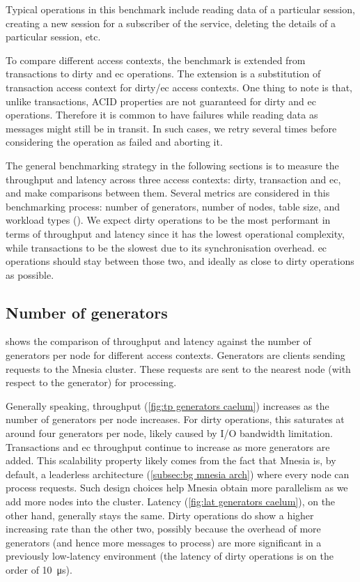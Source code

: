 Typical operations in this benchmark include reading
data of a particular session, creating a new session for a subscriber of
the service, deleting the details of a particular session, etc.

To compare different access contexts, the benchmark is extended from transactions 
to dirty and \acrshort{ec} operations. The extension is a substitution of transaction
access context for dirty/\acrshort{ec} access contexts. One thing to note is that,
unlike transactions, ACID properties are not guaranteed for dirty and \acrshort{ec}
operations. Therefore it is common
to have failures while reading data as messages might still be in transit. 
In such cases, we retry several times before considering the operation
as failed and aborting it.

The general benchmarking strategy in the following sections is to measure 
the throughput and latency across three access contexts: dirty, transaction 
and \acrshort{ec}, and make comparisons between them. Several metrics are 
considered in this benchmarking process: number of generators, 
number of nodes, table size, and workload types 
().
We expect dirty operations to be the most performant in terms of throughput and 
latency since it has the lowest 
operational complexity, while transactions to be the slowest
due to its synchronisation overhead. \acrshort{ec} operations should stay
between those two, and ideally as close to dirty operations as possible.


\subsection{Number of generators} \label{subsec:eval generator number}

 shows the comparison of throughput and latency against
the number of generators per node for different access contexts. Generators are clients 
sending requests to the Mnesia cluster. 
These requests are sent to the nearest node (with respect to the generator) for processing. 

Generally speaking, throughput (\cref{fig:tp generators caelum}) increases as 
the number of generators per node increases. For dirty operations, this saturates 
at around four generators per node, likely caused by I/O bandwidth limitation. 
Transactions and \acrshort{ec} throughput continue to increase as more generators are added. 
This scalability property likely comes from the fact that
Mnesia is, by default, a leaderless architecture (\cref{subsec:bg mnesia arch}) 
where every node can process requests. Such design choices help Mnesia obtain 
more parallelism as we add
more nodes into the cluster. Latency (\cref{fig:lat generators caelum}), on the
other hand, generally stays the same. Dirty operations do show a higher increasing
rate than the other two, possibly because the overhead of more generators (and hence
more messages to process) are more significant in a previously low-latency
environment (the latency of dirty operations is on the order of \qty{10}{\micro\second}).

